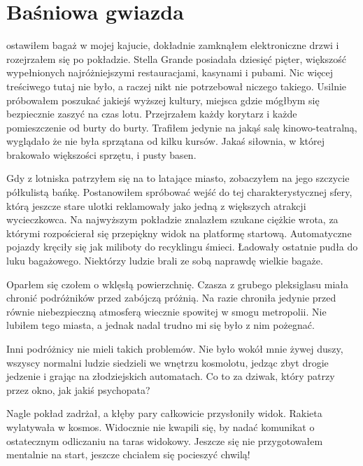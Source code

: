 \chapter{Baśniowa gwiazda} 


ostawiłem bagaż w mojej kajucie, dokładnie zamknąłem elektroniczne drzwi i rozejrzałem się po pokładzie.
Stella Grande posiadała dziesięć pięter, większość wypełnionych najróżniejszymi restauracjami, kasynami i pubami.
Nic więcej treściwego tutaj nie było, a raczej nikt nie potrzebował niczego takiego.
Usilnie próbowałem poszukać jakiejś wyższej kultury, miejsca gdzie mógłbym się bezpiecznie zaszyć na czas lotu.
Przejrzałem każdy korytarz i każde pomieszczenie od burty do burty.
Trafiłem jedynie na jakąś salę kinowo-teatralną, wyglądało że nie była sprzątana od kilku kursów.
Jakaś siłownia, w której brakowało większości sprzętu, i pusty basen.

Gdy z lotniska patrzyłem się na to latające miasto, zobaczyłem na jego szczycie półkulistą bańkę.
Postanowiłem spróbować wejść do tej charakterystycznej sfery, którą jeszcze stare ulotki reklamowały jako jedną z większych atrakcji wycieczkowca.
Na najwyższym pokładzie znalazłem szukane ciężkie wrota, za którymi rozpościerał się przepiękny widok na platformę startową.
Automatyczne pojazdy kręciły się jak miliboty do recyklingu śmieci.
Ładowały ostatnie pudła do luku bagażowego.
Niektórzy ludzie brali ze sobą naprawdę wielkie bagaże.

Oparłem się czołem o wklęsłą powierzchnię.
Czasza z grubego pleksiglasu miała chronić podróżników przed zabójczą próżnią.
Na razie chroniła jedynie przed równie niebezpieczną atmosferą wiecznie spowitej w smogu metropolii.
Nie lubiłem tego miasta, a jednak nadal trudno mi się było z nim pożegnać.

Inni podróżnicy nie mieli takich problemów.
Nie było wokół mnie żywej duszy, wszyscy normalni ludzie siedzieli we wnętrzu kosmolotu, jedząc zbyt drogie jedzenie i grając na złodziejskich automatach.
Co to za dziwak, który patrzy przez okno, jak jakiś psychopata?

Nagle pokład zadrżał, a kłęby pary całkowicie przysłoniły widok.
Rakieta wylatywała w kosmos.
Widocznie nie kwapili się, by nadać komunikat o ostatecznym odliczaniu na taras widokowy.
Jeszcze się nie przygotowałem mentalnie na start, jeszcze chciałem się pocieszyć chwilą!


